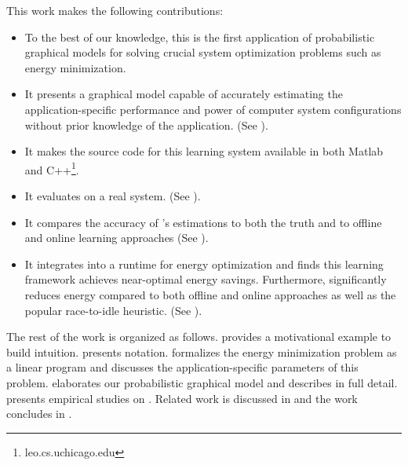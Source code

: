 This work makes the following contributions:
\begin{itemize}
\item To the best of our knowledge, this is the first application of
  probabilistic graphical models for solving crucial system
  optimization problems such as energy minimization.
\item It presents a graphical model capable of accurately
  estimating the application-specific performance and power of
  computer system configurations without prior knowledge of the
  application. (See ).
\item It makes the source code for this learning system available in
  both Matlab and C++\footnote{leo.cs.uchicago.edu}.
\item It evaluates \SYSTEMLEO{} on a real system. (See
  ).
\item It compares the accuracy of \SYSTEMLEO{}'s estimations to both the
  truth and to offline and online learning approaches (See
  ).
\item It integrates \SYSTEMLEO{} into a runtime for energy optimization
  and finds this learning framework achieves near-optimal energy
  savings.  Furthermore, \SYSTEMLEO{} significantly reduces energy
  compared to both offline and online approaches as well as the
  popular race-to-idle heuristic.  (See
  ).
\end{itemize}

The rest of the work is organized as follows. 
provides a motivational example to build intuition.
 presents notation.
 formalizes the energy minimization
problem as a linear program and discusses the application-specific
parameters of this problem.   elaborates our probabilistic graphical model and describes \SYSTEMLEO{} in full detail.
 presents empirical studies on \SYSTEMLEO{}.
Related work is discussed in  and the work
concludes in .
